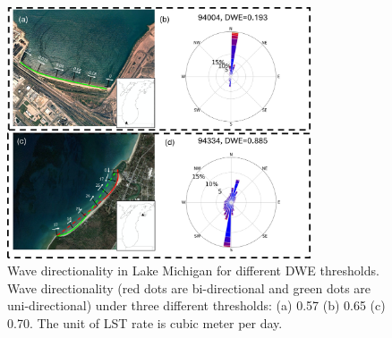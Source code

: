 \begin{figure}[htbp]
  \centering
  \includegraphics[width=0.8\textwidth]{appendix/resources/figure3-3a.jpg}
  \caption{Wave directionality in Lake Michigan for different DWE thresholds. Wave directionality (red dots are bi-directional and green dots are uni-directional) under three different thresholds: (a) 0.57 (b) 0.65 (c) 0.70. The unit of LST rate is cubic meter per day.}
  \label{fig:fig3.3a}
\end{figure}